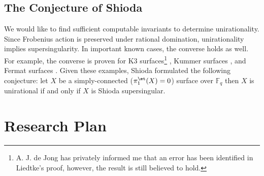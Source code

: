 \documentclass[10pt]{amsart}
\begin{document}
\subsection*{The Conjecture of Shioda}

We would like to find sufficient computable invariants to determine unirationality. Since Frobenius action is preserved under rational domination, unirationality implies supersingularity. In important known cases, the converse holds as well. For example, the converse is proven for K3 surfaces\footnote{A. J. de Jong has privately informed me that an error has been identified in Liedtke's proof, however, the result is still believed to hold.} \cite{liedtke}, Kummer surfaces \cite{shioda_some_results},  and Fermat surfaces \cite{shioda_on_fermat}. Given these examples, Shioda formulated \cite{shioda_some_results} the following conjecture: let $X$ be a simply-connected ($\pi_1^{\et}(X) = 0$) surface over $\mathbb{F}_q$ then $X$ is unirational if and only if $X$ is Shioda supersingular.

\section*{Research Plan}
\end{document}
